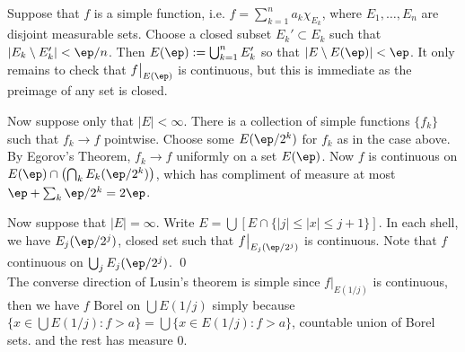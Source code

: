 \pf Suppose that $f$ is a simple function, i.e. $f= \sum_{k=1}^n a_k \chi_{E_k}$, where $E_1,\ldots,E_n$ are disjoint measurable sets. Choose a closed subset $E_k' \subset E_k$ such that $|E_k \setminus E_k'| < \ep/n$. Then $E(\ep):= \bigcup_{k=1}^n E_k'$ so that $|E\setminus E(\ep)|<\ep$. It only remains to check that $f\big|_{E(\ep)}$ is continuous, but this is immediate as the preimage of any set is closed.  


Now suppose only that $|E|<\infty$. There is a collection of simple functions $\{f_k\}$ such that $f_k \to f$ pointwise. Choose some $E(\ep/2^k)$ for $f_k$ as in the case above. By Egorov's Theorem, $f_k \to f$ uniformly on a set $E(\ep)$. Now $f$ is continuous on $E(\ep) \cap \left(\bigcap_k E_k(\ep/2^k)\right)$, which has compliment of measure at most $\ep+ \sum_k \ep/2^k=2\ep$. 


Now suppose that $|E|=\infty$. Write $E= \bigcup \left[ E \cap \{ |j| \leq |x| \leq j+1\}\right]$. In each shell, we have $E_j(\ep/2^j)$, closed set such that $f\big|_{E_j(\ep/2^j)}$ is continuous. Note that $f$ continuous on $\bigcup_j E_j(\ep/2^j)$. \qed \\




The converse direction of Lusin's theorem is simple since $f\big|_{E(1/j)}$ is continuous, then we have $f$ Borel on $\bigcup E(1/j)$ simply because $\{x \in \bigcup E(1/j) \colon f>a \}= \bigcup \{x \in E(1/j) \colon f>a\}$, countable union of Borel sets. and the rest has measure 0. 



























